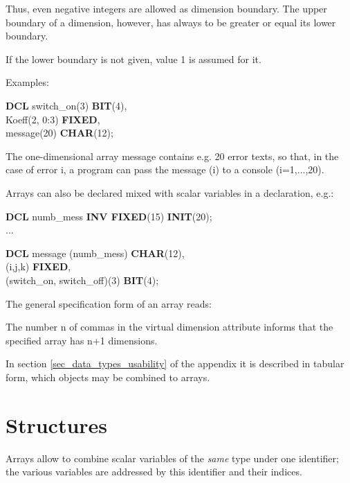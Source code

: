 Thus, even negative integers are allowed as dimension boundary. The
upper boundary of a dimension, however, has always to be greater or
equal its lower boundary.

If the lower boundary is not given, value 1 is assumed for it.


Examples:

{\bf DCL} switch\_on(3) {\bf BIT}(4),\\
\x Koeff(2, 0:3) {\bf FIXED},\\
\x message(20) {\bf CHAR}(12);

The one-dimensional array message contains e.g. 20 error texts, so that,
in the case of error i, a program can pass the message (i) to a console
(i=1,...,20).

Arrays can also be declared mixed with scalar variables in a declaration,
e.g.:

{\bf DCL} numb\_mess {\bf INV FIXED}(15) {\bf INIT}(20);\\
\x ...

{\bf DCL}  message (numb\_mess) {\bf CHAR}(12),\\
\x (i,j,k) {\bf FIXED},\\
\x (switch\_on, switch\_off)(3) {\bf BIT}(4);

The general specification form of an array reads:





The number n of commas in the virtual dimension attribute informs that
the specified array has n+1 dimensions.

In section \ref{sec_data_types_usability} of the appendix it is described in tabular form, which
objects may be combined to arrays.

\section{Structures}   %
\label{sec_struct}

Arrays allow to combine scalar variables of the {\it same} type under
one identifier; the various variables are addressed by this identifier
and their indices.

